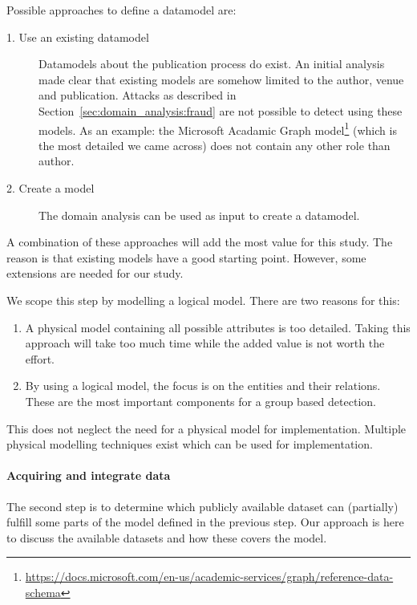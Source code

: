 \documentclass{ou-report}
\begin{document}
Possible approaches to define a datamodel are:
\begin{description}
    \item[1. Use an existing datamodel] Datamodels about the publication process
    do exist. An initial analysis made clear that existing models are
    somehow limited to the author, venue and publication. Attacks as described
    in Section~\ref{sec:domain_analysis:fraud} are not possible to detect using 
    these models. As an example: the Microsoft Acadamic Graph 
    model\footnote{\url{https://docs.microsoft.com/en-us/academic-services/graph/reference-data-schema}} 
    (which is the most detailed we came across) does not contain any other role 
    than author.
    \item[2. Create a model]  The domain analysis can be used as input to create
    a datamodel.
\end{description}

A combination of these approaches will add the most value for this study. The 
reason is that existing models have a good starting point. However, some 
extensions are needed for our study. 

We scope this step by modelling a logical model. There are two reasons for this:
\begin{enumerate}
    \item A physical model containing all possible attributes is too 
        detailed. Taking this approach will take too much time while the added
        value is not worth the effort.
    \item By using a logical model, the focus is on the entities and their
        relations. These are the most important components for a group based
        detection.
\end{enumerate}

This does not neglect the need for a physical model for implementation. 
Multiple physical modelling techniques exist which can be used for 
implementation.


\paragraph{Acquiring and integrate data}
The second step is to determine which publicly available dataset can (partially) 
fulfill some parts of the model defined in the previous step. Our approach is here to 
discuss the available datasets and how these covers the model.
\end{document}
